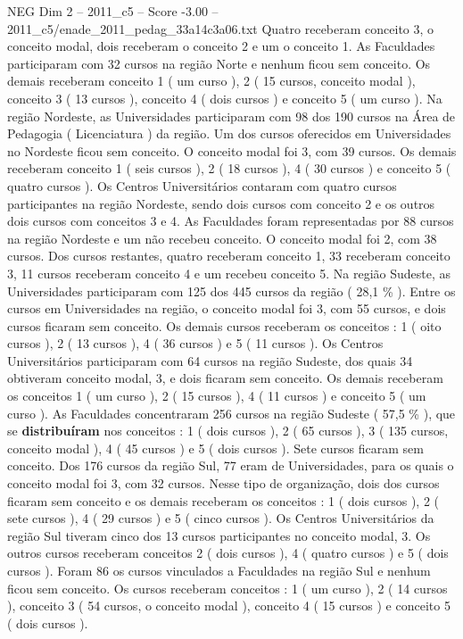 \begin{textsample}{NEG Dim 2 – 2011\_c5 – Score -3.00 – 2011\_c5/enade\_2011\_pedag\_33a14c3a06.txt}
Quatro receberam conceito 3, o conceito modal, dois receberam o conceito 2 e um o conceito 1.
As Faculdades participaram com 32 cursos na região Norte e nenhum ficou sem conceito.
Os demais receberam conceito 1 ( um curso ), 2 ( 15 cursos, conceito modal ), conceito 3 ( 13 cursos ), conceito 4 ( dois cursos ) e conceito 5 ( um curso ).
Na região Nordeste, as Universidades participaram com 98 dos 190 cursos na Área de Pedagogia ( Licenciatura ) da região.
Um dos cursos oferecidos em Universidades no Nordeste ficou sem conceito.
O conceito modal foi 3, com 39 cursos.
Os demais receberam conceito 1 ( seis cursos ), 2 ( 18 cursos ), 4 ( 30 cursos ) e conceito 5 ( quatro cursos ).
Os Centros Universitários contaram com quatro cursos participantes na região Nordeste, sendo dois cursos com conceito 2 e os outros dois cursos com conceitos 3 e 4.
As Faculdades foram representadas por 88 cursos na região Nordeste e um não recebeu conceito.
O conceito modal foi 2, com 38 cursos.
Dos cursos restantes, quatro receberam conceito 1, 33 receberam conceito 3, 11 cursos receberam conceito 4 e um recebeu conceito 5.
Na região Sudeste, as Universidades participaram com 125 dos 445 cursos da região ( 28,1 \% ).
Entre os cursos em Universidades na região, o conceito modal foi 3, com 55 cursos, e dois cursos ficaram sem conceito.
Os demais cursos receberam os conceitos : 1 ( oito cursos ), 2 ( 13 cursos ), 4 ( 36 cursos ) e 5 ( 11 cursos ).
Os Centros Universitários participaram com 64 cursos na região Sudeste, dos quais 34 obtiveram conceito modal, 3, e dois ficaram sem conceito.
Os demais receberam os conceitos 1 ( um curso ), 2 ( 15 cursos ), 4 ( 11 cursos ) e conceito 5 ( um curso ).
As Faculdades concentraram 256 cursos na região Sudeste ( 57,5 \% ), que se \textbf{distribuíram} nos conceitos : 1 ( dois cursos ), 2 ( 65 cursos ), 3 ( 135 cursos, conceito modal ), 4 ( 45 cursos ) e 5 ( dois cursos ).
Sete cursos ficaram sem conceito.
Dos 176 cursos da região Sul, 77 eram de Universidades, para os quais o conceito modal foi 3, com 32 cursos.
Nesse tipo de organização, dois dos cursos ficaram sem conceito e os demais receberam os conceitos : 1 ( dois cursos ), 2 ( sete cursos ), 4 ( 29 cursos ) e 5 ( cinco cursos ).
Os Centros Universitários da região Sul tiveram cinco dos 13 cursos participantes no conceito modal, 3.
Os outros cursos receberam conceitos 2 ( dois cursos ), 4 ( quatro cursos ) e 5 ( dois cursos ).
Foram 86 os cursos vinculados a Faculdades na região Sul e nenhum ficou sem conceito.
Os cursos receberam conceitos : 1 ( um curso ), 2 ( 14 cursos ), conceito 3 ( 54 cursos, o conceito modal ), conceito 4 ( 15 cursos ) e conceito 5 ( dois cursos ).

\end{textsample}
